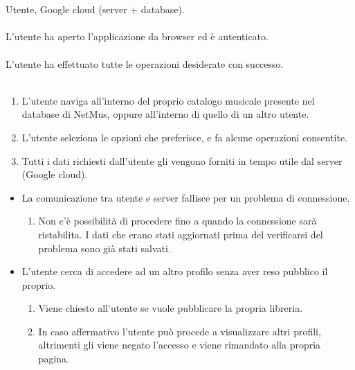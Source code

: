 \newpage
\vspace*{0.5cm}
\\\\
 Utente, Google cloud (server + database). \\\\
 L'utente ha aperto l'applicazione da browser ed \`e
autenticato. \\\\ 
 L'utente ha effettuato tutte le operazioni desiderate
con successo. \\\\
\begin{enumerate}
  \item L'utente naviga all'interno del proprio catalogo musicale presente nel
  database di NetMus, oppure all'interno di quello di un altro utente.
  \item L'utente seleziona le opzioni che preferisce, e fa alcune operazioni
  consentite.
  \item Tutti i dati richiesti dall'utente gli vengono forniti in tempo utile
  dal server (Google cloud).
\end{enumerate}
\begin{itemize}
  \item La comunicazione tra utente e server fallisce per un problema di
  connessione.
  \begin {enumerate}
    \item Non c'\`e possibilit\`a di procedere fino a quando la connessione sar\`a
    ristabilita. I dati che erano stati aggiornati prima del verificarsi del
    problema sono gi\`a stati salvati.
  \end{enumerate}
  \item L'utente cerca di accedere ad un altro profilo senza aver reso pubblico
  il proprio.
  \begin {enumerate}
    \item Viene chiesto all'utente se vuole pubblicare la propria libreria.
    \item In caso affermativo l'utente pu\`o procede a visualizzare altri profili,
    altrimenti gli viene negato l'accesso e viene rimandato alla propria pagina.
  \end{enumerate}
\end{itemize}
\newpage

